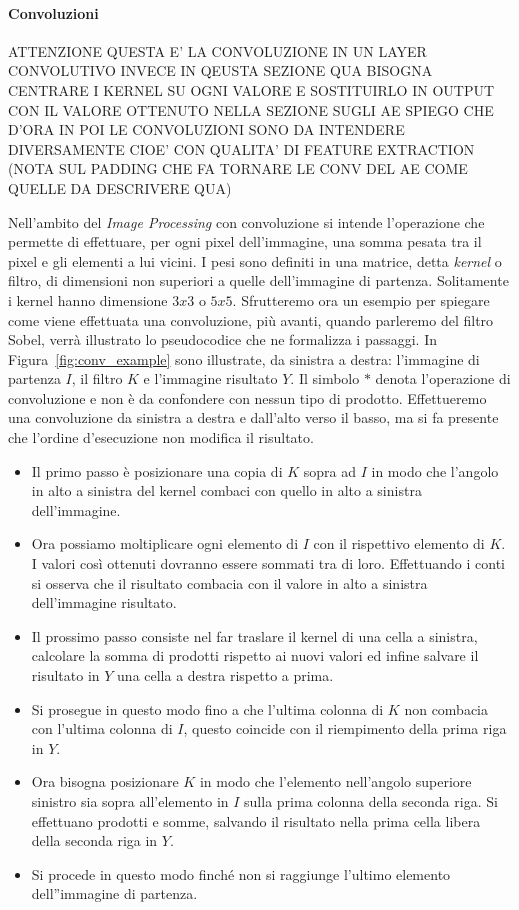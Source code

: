 \paragraph{Convoluzioni}
ATTENZIONE QUESTA E' LA CONVOLUZIONE IN UN LAYER CONVOLUTIVO
INVECE IN QEUSTA SEZIONE QUA BISOGNA CENTRARE I KERNEL SU OGNI VALORE E 
SOSTITUIRLO IN OUTPUT CON IL VALORE OTTENUTO
NELLA SEZIONE SUGLI AE SPIEGO CHE D'ORA IN POI LE CONVOLUZIONI SONO DA INTENDERE 
DIVERSAMENTE CIOE' CON QUALITA' DI FEATURE EXTRACTION (NOTA SUL PADDING CHE FA TORNARE LE CONV DEL AE COME QUELLE DA DESCRIVERE QUA)

Nell'ambito del \textit{Image Processing} con convoluzione si intende l'operazione che permette di effettuare, per ogni pixel dell'immagine, una somma pesata tra il pixel e gli elementi a lui vicini.
I pesi sono definiti in una matrice, detta \textit{kernel} o filtro, di dimensioni non superiori a quelle dell'immagine di partenza.
Solitamente i kernel hanno dimensione $3x3$ o $5x5$.
Sfrutteremo ora un esempio per spiegare come viene effettuata una convoluzione, più avanti, quando parleremo del filtro Sobel, verrà illustrato lo pseudocodice che ne formalizza i passaggi.
In Figura~\ref{fig:conv_example} sono illustrate, da sinistra a destra: l'immagine di partenza $I$, il filtro $K$ e l'immagine risultato $Y$.
Il simbolo $*$ denota l'operazione di convoluzione e non è da confondere con nessun tipo di prodotto.
Effettueremo una convoluzione da sinistra a destra e dall'alto verso il basso, ma si fa presente che l'ordine d'esecuzione non modifica il risultato.
\begin{itemize}
  \item Il primo passo è posizionare una copia di $K$ sopra ad $I$ in modo che l'angolo in alto a sinistra del kernel combaci con quello in alto a sinistra dell'immagine.
  \item Ora possiamo moltiplicare ogni elemento di $I$ con il rispettivo elemento di $K$.
    I valori così ottenuti dovranno essere sommati tra di loro.
    Effettuando i conti si osserva che il risultato combacia con il valore in alto a sinistra dell'immagine risultato.
  \item Il prossimo passo consiste nel far traslare il kernel di una cella a sinistra, calcolare la somma di prodotti rispetto ai nuovi valori ed infine salvare il risultato in $Y$ una cella a destra rispetto a prima.
  \item Si prosegue in questo modo fino a che l'ultima colonna di $K$ non combacia con l'ultima colonna di $I$, questo coincide con il riempimento della prima riga in $Y$.
  \item Ora bisogna posizionare $K$ in modo che l'elemento nell'angolo superiore sinistro sia sopra all'elemento in $I$ sulla prima colonna della seconda riga.
    Si effettuano prodotti e somme, salvando il risultato nella prima cella libera della seconda riga in $Y$.
  \item Si procede in questo modo finché non si raggiunge l'ultimo elemento dell''immagine di partenza.
\end{itemize}

